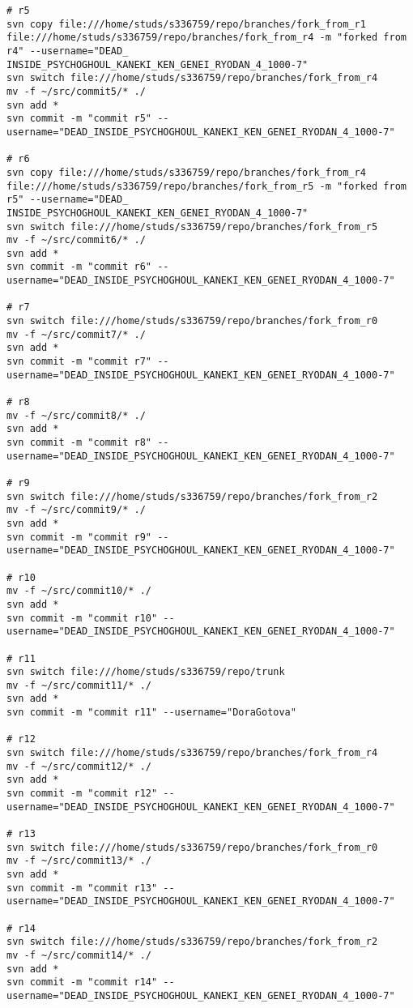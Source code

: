\thispagestyle{empty}
\BgThispage
\tiny
\begin{verbatim}
# r5
svn copy file:///home/studs/s336759/repo/branches/fork_from_r1 file:///home/studs/s336759/repo/branches/fork_from_r4 -m "forked from r4" --username="DEAD_
INSIDE_PSYCHOGHOUL_KANEKI_KEN_GENEI_RYODAN_4_1000-7"
svn switch file:///home/studs/s336759/repo/branches/fork_from_r4
mv -f ~/src/commit5/* ./
svn add *
svn commit -m "commit r5" --username="DEAD_INSIDE_PSYCHOGHOUL_KANEKI_KEN_GENEI_RYODAN_4_1000-7"

# r6
svn copy file:///home/studs/s336759/repo/branches/fork_from_r4 file:///home/studs/s336759/repo/branches/fork_from_r5 -m "forked from r5" --username="DEAD_
INSIDE_PSYCHOGHOUL_KANEKI_KEN_GENEI_RYODAN_4_1000-7"
svn switch file:///home/studs/s336759/repo/branches/fork_from_r5
mv -f ~/src/commit6/* ./
svn add *
svn commit -m "commit r6" --username="DEAD_INSIDE_PSYCHOGHOUL_KANEKI_KEN_GENEI_RYODAN_4_1000-7"

# r7
svn switch file:///home/studs/s336759/repo/branches/fork_from_r0
mv -f ~/src/commit7/* ./
svn add *
svn commit -m "commit r7" --username="DEAD_INSIDE_PSYCHOGHOUL_KANEKI_KEN_GENEI_RYODAN_4_1000-7"

# r8
mv -f ~/src/commit8/* ./
svn add *
svn commit -m "commit r8" --username="DEAD_INSIDE_PSYCHOGHOUL_KANEKI_KEN_GENEI_RYODAN_4_1000-7"

# r9
svn switch file:///home/studs/s336759/repo/branches/fork_from_r2
mv -f ~/src/commit9/* ./
svn add *
svn commit -m "commit r9" --username="DEAD_INSIDE_PSYCHOGHOUL_KANEKI_KEN_GENEI_RYODAN_4_1000-7"

# r10
mv -f ~/src/commit10/* ./
svn add *
svn commit -m "commit r10" --username="DEAD_INSIDE_PSYCHOGHOUL_KANEKI_KEN_GENEI_RYODAN_4_1000-7"

# r11
svn switch file:///home/studs/s336759/repo/trunk
mv -f ~/src/commit11/* ./
svn add *
svn commit -m "commit r11" --username="DoraGotova"

# r12
svn switch file:///home/studs/s336759/repo/branches/fork_from_r4
mv -f ~/src/commit12/* ./
svn add *
svn commit -m "commit r12" --username="DEAD_INSIDE_PSYCHOGHOUL_KANEKI_KEN_GENEI_RYODAN_4_1000-7"

# r13
svn switch file:///home/studs/s336759/repo/branches/fork_from_r0
mv -f ~/src/commit13/* ./
svn add *
svn commit -m "commit r13" --username="DEAD_INSIDE_PSYCHOGHOUL_KANEKI_KEN_GENEI_RYODAN_4_1000-7"

# r14
svn switch file:///home/studs/s336759/repo/branches/fork_from_r2
mv -f ~/src/commit14/* ./
svn add *
svn commit -m "commit r14" --username="DEAD_INSIDE_PSYCHOGHOUL_KANEKI_KEN_GENEI_RYODAN_4_1000-7"


\end{verbatim}

